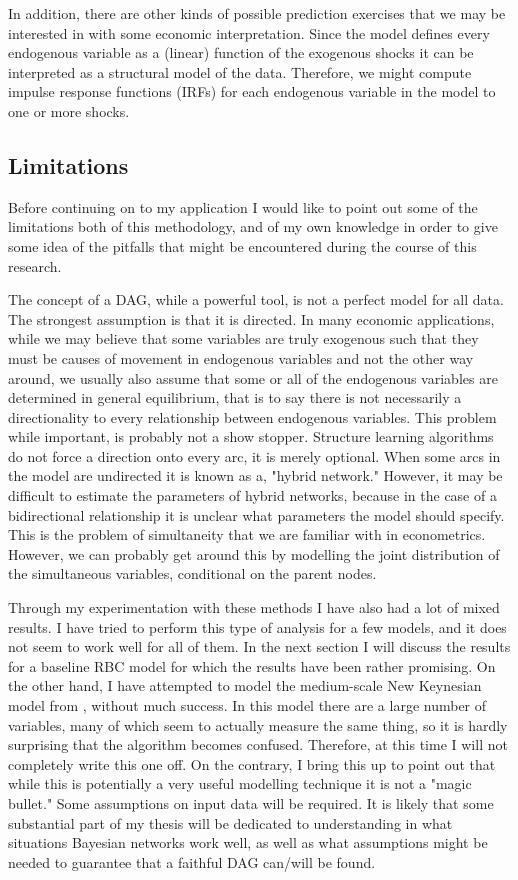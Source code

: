 \documentclass{article}
\begin{document}
In addition, there are other kinds of possible prediction exercises that we may be interested in with some economic interpretation. Since the model defines every endogenous variable as a (linear) function of the exogenous shocks it can be interpreted as a structural model of the data. Therefore, we might compute impulse response functions (IRFs) for each endogenous variable in the model to one or more shocks.

\subsection{Limitations}

Before continuing on to my application I would like to point out some of the limitations both of this methodology, and of my own knowledge in order to give some idea of the pitfalls that might be encountered during the course of this research. 

The concept of a DAG, while a powerful tool, is not a perfect model for all data. The strongest assumption is that it is directed. In many economic applications, while we may believe that some variables are truly exogenous such that they must be causes of movement in endogenous variables and not the other way around, we usually also assume that some or all of the endogenous variables are determined in general equilibrium, that is to say there is not necessarily a directionality to every relationship between endogenous variables. This problem while important, is probably not a show stopper. Structure learning algorithms do not force a direction onto every arc, it is merely optional. When some arcs in the model are undirected it is known as a, "hybrid network." However, it may be difficult to estimate the parameters of hybrid networks, because in the case of a bidirectional relationship it is unclear what parameters the model should specify. This is the problem of simultaneity that we are familiar with in econometrics. However, we can probably get around this by modelling the joint distribution of the simultaneous variables, conditional on the parent nodes.

Through my experimentation with these methods I have also had a lot of mixed results. I have tried to perform this type of analysis for a few models, and it does not seem to work well for all of them. In the next section I will discuss the results for a baseline RBC model for which the results have been rather promising. On the other hand, I have attempted to model the medium-scale New Keynesian model from \parencite{smets2007shocks}, without much success. In this model there are a large number of variables, many of which seem to actually measure the same thing, so it is hardly surprising that the algorithm becomes confused. Therefore, at this time I will not completely write this one off. On the contrary, I bring this up to point out that while this is potentially a very useful modelling technique it is not a "magic bullet." Some assumptions on input data will be required. It is likely that some substantial part of my thesis will be dedicated to understanding in what situations Bayesian networks work well, as well as what assumptions might be needed to guarantee that a faithful DAG can/will be found.
\end{document}
